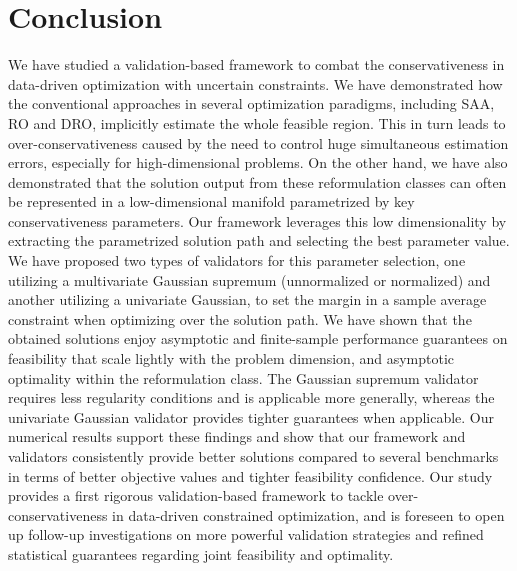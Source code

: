 \documentclass[mnsc,blindrev]{informs4} %
\begin{document}
\section{Conclusion}
We have studied a validation-based framework to combat the conservativeness in data-driven optimization with uncertain constraints. We have demonstrated how the conventional approaches in several optimization paradigms, including SAA, RO and DRO, implicitly estimate the whole feasible region. This in turn leads to over-conservativeness caused by the need to control huge simultaneous estimation errors, especially for high-dimensional problems. On the other hand, we have also demonstrated that the solution output from these reformulation classes can often be represented in a low-dimensional manifold parametrized by key conservativeness parameters.
Our framework leverages this low dimensionality by extracting the parametrized solution path and selecting the best parameter value. We have proposed two types of validators for this parameter selection, one utilizing a multivariate Gaussian supremum (unnormalized or normalized) and another utilizing a univariate Gaussian, to set the margin in a sample average constraint when optimizing over the solution path. We have shown that the obtained solutions enjoy asymptotic and finite-sample performance guarantees on feasibility that scale lightly with the problem dimension, and asymptotic optimality within the reformulation class. The Gaussian supremum validator requires less regularity conditions and is applicable more generally, whereas the univariate Gaussian validator provides tighter guarantees when applicable. Our numerical results support these findings and show that our framework and validators consistently provide better solutions  compared to several benchmarks in terms of better objective values and tighter feasibility confidence. Our study provides a first rigorous validation-based framework to tackle over-conservativeness in data-driven constrained optimization, and is foreseen to open up follow-up investigations on more powerful validation strategies and refined statistical guarantees regarding joint feasibility and optimality.

\end{document}
